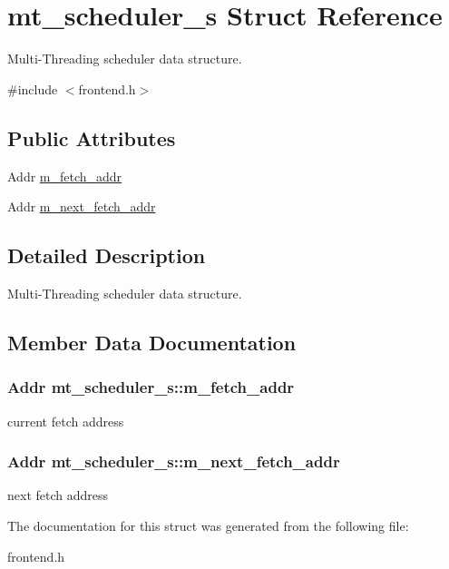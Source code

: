 \hypertarget{structmt__scheduler__s}{
\section{mt\_\-scheduler\_\-s Struct Reference}
\label{structmt__scheduler__s}
}


Multi-\/Threading scheduler data structure.  




{\ttfamily \#include $<$frontend.h$>$}

\subsection*{Public Attributes}
\begin{DoxyCompactItemize}
\item 
Addr \hyperlink{structmt__scheduler__s_a8f5c01bc526c65e096e6b44d60c6d76f}{m\_\-fetch\_\-addr}
\item 
Addr \hyperlink{structmt__scheduler__s_a068da90109ff4cd4f00b184a5b74c07e}{m\_\-next\_\-fetch\_\-addr}
\end{DoxyCompactItemize}


\subsection{Detailed Description}
Multi-\/Threading scheduler data structure. 

\subsection{Member Data Documentation}
\hypertarget{structmt__scheduler__s_a8f5c01bc526c65e096e6b44d60c6d76f}{
\subsubsection[{m\_\-fetch\_\-addr}]{\setlength{\rightskip}{0pt plus 5cm}Addr {\bf mt\_\-scheduler\_\-s::m\_\-fetch\_\-addr}}}
\label{structmt__scheduler__s_a8f5c01bc526c65e096e6b44d60c6d76f}
current fetch address \hypertarget{structmt__scheduler__s_a068da90109ff4cd4f00b184a5b74c07e}{
\subsubsection[{m\_\-next\_\-fetch\_\-addr}]{\setlength{\rightskip}{0pt plus 5cm}Addr {\bf mt\_\-scheduler\_\-s::m\_\-next\_\-fetch\_\-addr}}}
\label{structmt__scheduler__s_a068da90109ff4cd4f00b184a5b74c07e}
next fetch address 

The documentation for this struct was generated from the following file:\begin{DoxyCompactItemize}
\item 
frontend.h\end{DoxyCompactItemize}
